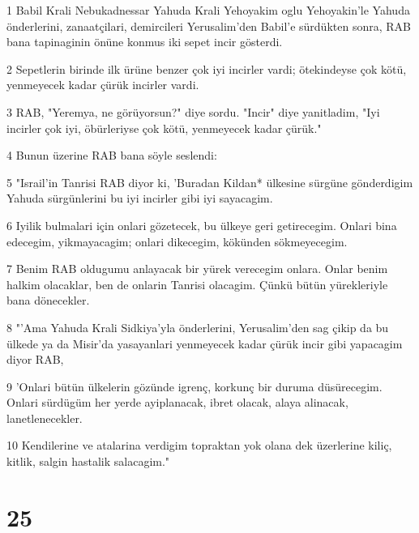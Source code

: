 \par 1 Babil Krali Nebukadnessar Yahuda Krali Yehoyakim oglu Yehoyakin'le Yahuda önderlerini, zanaatçilari, demircileri Yerusalim'den Babil'e sürdükten sonra, RAB bana tapinaginin önüne konmus iki sepet incir gösterdi.
\par 2 Sepetlerin birinde ilk ürüne benzer çok iyi incirler vardi; ötekindeyse çok kötü, yenmeyecek kadar çürük incirler vardi.
\par 3 RAB, "Yeremya, ne görüyorsun?" diye sordu. "Incir" diye yanitladim, "Iyi incirler çok iyi, öbürleriyse çok kötü, yenmeyecek kadar çürük."
\par 4 Bunun üzerine RAB bana söyle seslendi:
\par 5 "Israil'in Tanrisi RAB diyor ki, 'Buradan Kildan* ülkesine sürgüne gönderdigim Yahuda sürgünlerini bu iyi incirler gibi iyi sayacagim.
\par 6 Iyilik bulmalari için onlari gözetecek, bu ülkeye geri getirecegim. Onlari bina edecegim, yikmayacagim; onlari dikecegim, kökünden sökmeyecegim.
\par 7 Benim RAB oldugumu anlayacak bir yürek verecegim onlara. Onlar benim halkim olacaklar, ben de onlarin Tanrisi olacagim. Çünkü bütün yürekleriyle bana dönecekler.
\par 8 "'Ama Yahuda Krali Sidkiya'yla önderlerini, Yerusalim'den sag çikip da bu ülkede ya da Misir'da yasayanlari yenmeyecek kadar çürük incir gibi yapacagim diyor RAB,
\par 9 'Onlari bütün ülkelerin gözünde igrenç, korkunç bir duruma düsürecegim. Onlari sürdügüm her yerde ayiplanacak, ibret olacak, alaya alinacak, lanetlenecekler.
\par 10 Kendilerine ve atalarina verdigim topraktan yok olana dek üzerlerine kiliç, kitlik, salgin hastalik salacagim."

\chapter{25}

